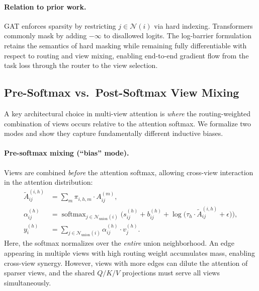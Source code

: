 \documentclass[11pt,a4paper]{article}
\newcommand{\calN}{\mathcal{N}}
\DeclareMathOperator{\softmax}{softmax}
\begin{document}
\paragraph{Relation to prior work.}
GAT \citep{velickovic2018graph} enforces sparsity by restricting
$j \in \calN(i)$ via hard indexing.
Transformers commonly mask by adding $-\infty$ to disallowed logits.
The log-barrier formulation retains the semantics of hard masking while
remaining fully differentiable with respect to routing and view mixing,
enabling end-to-end gradient flow from the task loss through the router
to the view selection.

\subsection{Pre-Softmax vs.\ Post-Softmax View Mixing}
\label{sec:pre_vs_post}

A key architectural choice in multi-view attention is \emph{where} the
routing-weighted combination of views occurs relative to the attention
softmax.
We formalize two modes and show they capture fundamentally different
inductive biases.

\paragraph{Pre-softmax mixing (``bias'' mode).}
Views are combined \emph{before} the attention softmax, allowing
cross-view interaction in the attention distribution:
\begin{align}
  \tilde{A}_{ij}^{(i,h)} &= \sum_{m} \pi_{i,h,m} \cdot A_{ij}^{(m)},
  \label{eq:presoftmax_A} \\
  \alpha_{ij}^{(h)} &= \softmax_{j \in \calN_{\mathrm{union}}(i)}\!\Big(
    s_{ij}^{(h)} + b_{ij}^{(h)} +
    \log\big(\tau_h \cdot \tilde{A}_{ij}^{(i,h)} + \epsilon\big)\Big),
  \label{eq:presoftmax_attn} \\
  y_i^{(h)} &= \sum_{j \in \calN_{\mathrm{union}}(i)}
    \alpha_{ij}^{(h)} \cdot v_j^{(h)}.
  \label{eq:presoftmax_agg}
\end{align}
Here, the softmax normalizes over the \emph{entire} union neighborhood.
An edge appearing in multiple views with high routing weight accumulates
mass, enabling cross-view synergy.
However, views with more edges can dilute the attention of sparser views,
and the shared $Q/K/V$ projections must serve all views simultaneously.
\end{document}
